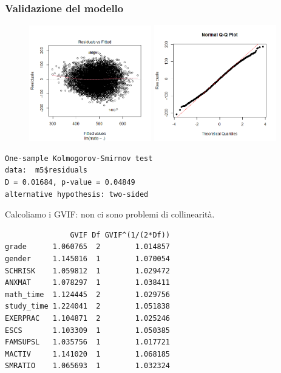 \documentclass{beamer}
\begin{document}
\begin{frame}[fragile]
\frametitle{Validazione del modello}
\begin{figure}
\includegraphics[width=0.475\textwidth]{omoscfinal}
\hfill
\includegraphics[width=0.475\textwidth]{normfinal}
\end{figure}
{\scriptsize
\begin{verbatim}
One-sample Kolmogorov-Smirnov test
data:  m5$residuals
D = 0.01684, p-value = 0.04849
alternative hypothesis: two-sided
\end{verbatim}
}
\end{frame}

\begin{frame}[fragile]
Calcoliamo i GVIF: non ci sono problemi di collinearità.


{\scriptsize
\begin{verbatim}
               GVIF Df GVIF^(1/(2*Df))
grade      1.060765  2        1.014857
gender     1.145016  1        1.070054
SCHRISK    1.059812  1        1.029472
ANXMAT     1.078297  1        1.038411
math_time  1.124445  2        1.029756
study_time 1.224041  2        1.051838
EXERPRAC   1.104871  2        1.025246
ESCS       1.103309  1        1.050385
FAMSUPSL   1.035756  1        1.017721
MACTIV     1.141020  1        1.068185
SMRATIO    1.065693  1        1.032324 
\end{verbatim}
}
\end{frame}
\end{document}
